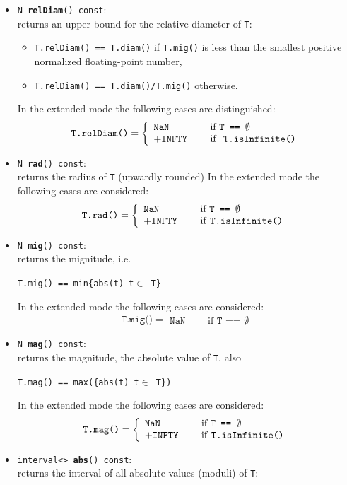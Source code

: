 \documentclass{report}
\newcommand{\INFTY}{\texttt{INFTY}}
\begin{document}
\begin{itemize}
			\item \texttt{N {\bf relDiam}() const}:\\ returns an
				upper bound for the relative diameter
				of \texttt{T}:
				\begin{itemize}
				\item[] \texttt{T.relDiam() == T.diam()}
				if \texttt{T.mig()} is less than
				the smallest positive normalized
				floating-point number,
				\item[] \texttt{T.relDiam() ==
				T.diam()/T.mig()} otherwise. 
								\end{itemize}
In the extended mode the following
				cases are distinguished:
				\[
					\texttt{T.relDiam()} = \left\lbrace\begin{array}{lcl}
					\texttt{NaN}&\textrm{\ }&\textrm{if\ }\texttt{T == $\emptyset$}\\
					+\INFTY &&\textrm{\textrm{if } \texttt{T.isInfinite()}} 
					\end{array}\right.
				\]
			\item \texttt{N {\bf rad}() const}:\\ returns the
				radius of \texttt{T} (upwardly rounded)
				In the extended mode the following
				cases are considered:
				\[
					\texttt{T.rad()} = \left\lbrace\begin{array}{lcl}
					\texttt{NaN}&\textrm{\ }&\textrm{if\ }\texttt{T == $\emptyset$}\\
					+\INFTY &&\textrm{\textrm{if }\texttt{T.isInfinite()} }
					\end{array}\right.
				\]


		\item \texttt{N {\bf mig}() const}:\\ returns the
				mignitude, i.e.
				\begin{center}\texttt{T.mig() == min\{abs(t) t$\in$ T\}} \end{center}
			In the extended mode the following
				cases are considered:
				\[
					\texttt{T.mig()} = \left.\begin{array}{lcl}
					\texttt{NaN}&\textrm{\ }&\textrm{if\ }\texttt{T == $\emptyset$}
					\end{array}\right.
				\]
			\item \texttt{N {\bf mag}() const}:\\ returns the
				magnitude, the absolute value of \texttt{T}.
				also
				\begin{center}\texttt{T.mag() == max(\{abs(t) t$\in$ T\})} \end{center}
				In the extended mode the following
				cases are considered:
				\[
					\texttt{T.mag()} = \left\lbrace\begin{array}{lcl}
					\texttt{NaN}&\textrm{\ }&\textrm{if\ }\texttt{T == $\emptyset$}\\
					+\INFTY &&\textrm{if \texttt{T.isInfinite()}} 
					\end{array}\right.
				\]
			\item \texttt{interval<> {\bf abs}()
				const}:\\returns the interval of all
				absolute values (moduli) of \texttt{T}:
				

\end{itemize}
\end{document}

